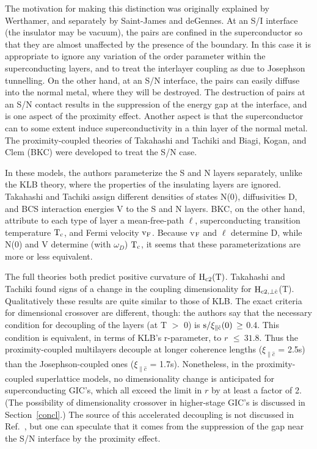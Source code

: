         The motivation for making this distinction was originally explained
by     Werthamer,     and        separately       by     Saint-James    and
deGennes.\cite{werthamer63,degennes66}  At an S/I  interface (the insulator
may be vacuum), the pairs  are confined in the superconductor  so that they
are almost unaffected by the presence of the boundary.  In this case  it is
appropriate to ignore   any variation of   the  order  parameter within the
superconducting  layers, and  to treat the interlayer  coupling  as  due to
Josephson tunnelling.\cite{lawrence71} On  the   other  hand, at   an   S/N
interface, the pairs  can easily diffuse into the  normal metal, where they
will  be destroyed.\cite{degennes66} The   destruction of  pairs  at an S/N
contact results in the suppression of the energy gap at the  interface, and
is one  aspect  of  the  proximity  effect.   Another  aspect  is that  the
superconductor can to some extent induce superconductivity  in a thin layer
of  the normal  metal.\cite{cooper61}   The proximity-coupled   theories of
Takahashi   and    Tachiki\cite{takahashi86b}   and  Biagi,    Kogan,   and
Clem\cite{biagi85} (BKC) were developed to treat the S/N case.

        In  these  models,  the  authors parameterize  the  S and  N layers
separately, unlike the KLB theory, where the properties  of  the insulating
layers are  ignored.\cite{klemm75} Takahashi and Tachiki\cite{takahashi86b}
assign different densities   of    states N(0), diffusivities D,   and  BCS
interaction  energies V to the S  and N layers.    BKC, on  the other hand,
attribute to each  type of layer  a mean-free-path  $\ell$, superconducting
transition  temperature      $\rm   T_c$,    and      Fermi  velocity  $\rm
v_F$.\cite{biagi85} Because v$\rm _F$ and  $\ell$ determine D, while N(0) and
V   determine    (with $\omega_D$)   $\rm    T_c$,  it  seems  that   these
parameterizations are more or less equivalent.
        
        The   full   theories  both predict   positive  curvature   of $\rm
H_{c2}(T)$.  Takahashi and Tachiki found signs  of a change in the coupling
dimensionality for    $\rm  H_{c2,  \perp  \hat{c}}$(T).\cite{takahashi86b}
Qualitatively these results  are quite similar to those  of KLB.  The exact
criteria for dimensional crossover are  different,  though: the authors say
that the necessary condition for decoupling of  the layers  (at T $>$ 0) is
$\rm  s/ \xi_{\parallel \hat{c}}(0) \,    \geq$  0.4.   This condition   is
equivalent, in terms of KLB's r-parameter, to $r$ $\leq \: 31.8$.  Thus the
proximity-coupled  multilayers  decouple   at   longer  coherence   lengths
($\xi_{\parallel    \hat{c}}$  = 2.5s)  than   the Josephson-coupled   ones
($\xi_{\parallel \hat{c}}$ = 1.7s).   Nonetheless, in the proximity-coupled
superlattice   models, no dimensionality     change   is  anticipated   for
superconducting  GIC's, which all exceed the  limit  in $r$  by at least  a
factor of 2.  (The possibility  of dimensionality crossover in higher-stage
GIC's is discussed in Section~\ref{concl}.)  The source of this accelerated
decoupling  is not   discussed  in Ref.~\cite{takahashi86b},  but  one  can
speculate that  it  comes from  the suppression of  the gap  near   the S/N
interface by the proximity effect.


